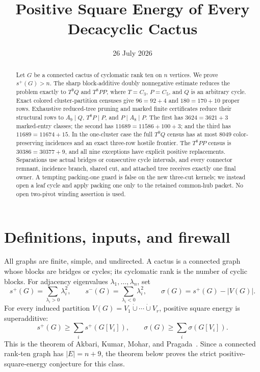\documentclass[11pt]{article}
\title{Positive Square Energy of Every Decacyclic Cactus}
\author{}
\date{26 July 2026}
\newcommand{\spE}{s^+}
\newcommand{\smE}{s^-}
\newcommand{\sig}{\sigma}
\begin{document}
\maketitle

\begin{abstract}
Let $G$ be a connected cactus of cyclomatic rank ten on $n$ vertices.  We
prove $s^+(G)>n$.  The sharp block-additive doubly nonnegative estimate reduces
the problem exactly to $T^9Q$ and $T^8PP$, where $T=C_3$, $P=C_5$, and $Q$ is
an arbitrary cycle.  Exact colored cluster-partition censuses give
$96=92+4$ and $180=170+10$ proper rows.  Exhaustive reduced-tree pruning and marked finite
certificates reduce their structural rows to $A_9\mid Q$, $T^8P\mid P$, and
$P\mid A_8\mid P$.  The first has $3624=3621+3$ marked-entry classes; the
second has $11689=11586+100+3$; and the third has
$11689=11674+15$.  In the one-cluster case the full $T^9Q$ census has at most
$8049$ color-preserving incidences and an exact three-row hostile frontier.
The $T^8PP$ census is $30386=30377+9$, and all nine exceptions have explicit
positive replacements.  Separations use actual bridges or consecutive cycle
intervals, and every connector remnant, incidence branch, shared cut, and
attached tree receives exactly one final owner.  A tempting packing-one guard
is false on the new three-cut kernels; we instead open a leaf cycle and apply
packing one only to the retained common-hub packet.  No open two-pivot winding
assertion is used.
\end{abstract}

\section{Definitions, inputs, and firewall}

All graphs are finite, simple, and undirected.  A cactus is a connected graph
whose blocks are bridges or cycles; its cyclomatic rank is the number of cyclic
blocks.  For adjacency eigenvalues $\lambda_1,\ldots,\lambda_n$, set
\[
 \spE(G)=\sum_{\lambda_i>0}\lambda_i^2,
 \qquad \smE(G)=\sum_{\lambda_i<0}\lambda_i^2,
 \qquad \sig(G)=\spE(G)-|V(G)|.
\]
For every induced partition $V(G)=V_1\mathbin{\dot\cup}\cdots
\mathbin{\dot\cup}V_r$, positive square energy is superadditive:
\begin{equation}\label{eq:super}
 \spE(G)\geq\sum_i\spE(G[V_i]),
 \qquad \sig(G)\geq\sum_i\sig(G[V_i]).
\end{equation}
This is the theorem of Akbari, Kumar, Mohar, and Pragada~\cite{AKMP}.
Since a connected rank-ten graph has $|E|=n+9$, the theorem below proves the
strict positive-square-energy conjecture for this class.
\end{document}
